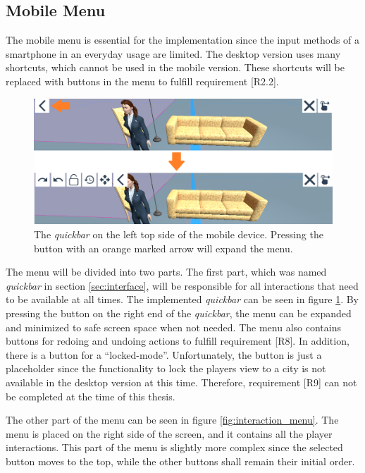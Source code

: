 \subsection{Mobile Menu}
\label{sec:menu}

The mobile menu is essential for the implementation since the input methods of a smartphone in an everyday usage are limited.
The desktop version uses many \glspl{shortcut}, which cannot be used in the mobile version.
These \glspl{shortcut} will be replaced with buttons in the menu to fulfill requirement [R2.2].

\begin{figure}[htb]
    \centering
    \includegraphics[width=1\textwidth]{Implementation/img/quickmenu.png}
    \caption{The \textit{quickbar} on the left top side of the mobile device. Pressing the button with an orange marked arrow will expand the menu.}\label{fig:quickmenu}
\end{figure}

The menu will be divided into two parts.
The first part, which was named \textit{quickbar} in section \ref{sec:interface}, will be responsible for all interactions that need to be available at all times.
The implemented \textit{quickbar} can be seen in figure \ref{fig:quickmenu}.
By pressing the button on the right end of the \textit{quickbar}, the menu can be expanded and minimized to safe screen space when not needed.
The menu also contains buttons for redoing and undoing actions to fulfill requirement [R8].
In addition, there is a button for a \enquote{locked-mode}.
Unfortunately, the button is just a placeholder since the functionality to lock the players view to a city is not available in the desktop version at this time.
Therefore, requirement [R9] can not be completed at the time of this thesis. 

The other part of the menu can be seen in figure \ref{fig:interaction_menu}.
The menu is placed on the right side of the screen, and it contains all the player interactions.
This part of the menu is slightly more complex since the selected button moves to the top, while the other buttons shall remain their initial order.

